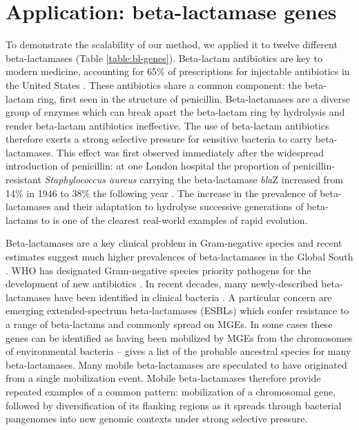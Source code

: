 \documentclass[rmp,superscriptaddress,11pt]{revtex4-1}
\begin{document}
\section{Application: beta-lactamase genes}

\noindent To demonstrate the scalability of our method, we applied it to twelve different beta-lactamases (Table \ref{table:bl-genes}). Beta-lactam antibiotics are key to modern medicine, accounting for 65\% of prescriptions for injectable antibiotics in the United States \cite{Bush2016}. These antibiotics share a common component: the beta-lactam ring, first seen in the structure of penicillin. Beta-lactamases are a diverse group of enzymes which can break apart the beta-lactam ring by hydrolysis and render beta-lactam antibiotics ineffective. The use of beta-lactam antibiotics therefore exerts a strong selective pressure for sensitive bacteria  to carry beta-lactamases. This effect was first observed immediately after the widespread introduction of penicillin: at one London hospital the proportion of penicillin-resistant \textit{Staphylococcus aureus} carrying the beta-lactamase \textit{bla}Z increased from 14\% in 1946 to 38\% the following year \cite{Barber1947}. The increase in the prevalence of beta-lactamases and their adaptation to hydrolyse successive generations of beta-lactams to  is one of the clearest real-world examples of rapid evolution.\par

Beta-lactamases are a key clinical problem in Gram-negative species \cite{Bush2020} and recent estimates suggest much higher prevalences of beta-lactamases in the Global South \cite{Global2022}. WHO has designated Gram-negative species priority pathogens for the development of new antibiotics \cite{WHO2017}. In recent decades, many newly-described beta-lactamases have been identified in clinical bacteria \cite{Bush2020}. A particular concern are emerging extended-spectrum beta-lactamases (ESBLs) which confer resistance to a range of beta-lactams \cite{Livermore2008} and commonly spread on MGEs. In some cases these genes can be identified as having been mobilized by MGEs from the chromosomes of environmental bacteria {--} \textcite{Partridge2011a} gives a list of the probable ancestral species for many beta-lactamases. Many mobile beta-lactamases are speculated to have originated from a single mobilization event. Mobile beta-lactamases therefore provide repeated examples of a common pattern: mobilization of a chromosomal gene, followed by diversification of its flanking regions as it spreads through bacterial pangenomes into new genomic contexts under strong selective pressure.\par
\end{document}

